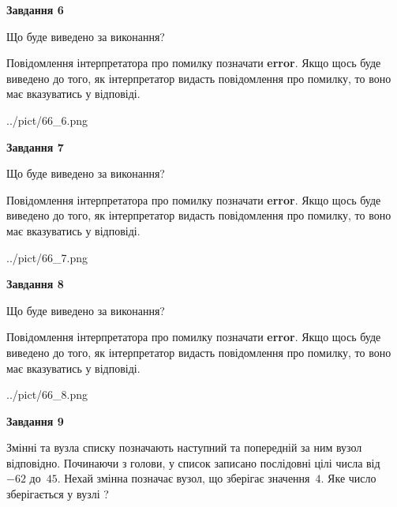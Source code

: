 \documentclass[12pt, ukrainian]{article}
\begin{document}
{\begin {large}
{\begin {center}\textbf{Завдання 6}\end {center}}\par
Що буде виведено за виконання?

Повідомлення інтерпретатора про помилку позначати \textbf{error}.
Якщо щось буде виведено до того, як інтерпретатор видасть повідомлення про помилку, 
то воно має вказуватись у відповіді. \par


\begin{center}
	{../pict/66_6.png}
\end{center}
\newpage

{\begin {center}\textbf{Завдання 7}\end {center}}\par
Що буде виведено за виконання?

Повідомлення інтерпретатора про помилку позначати \textbf{error}.
Якщо щось буде виведено до того, як інтерпретатор видасть повідомлення про помилку, 
то воно має вказуватись у відповіді. \par


\begin{center}
	{../pict/66_7.png}
\end{center}
\newpage

{\begin {center}\textbf{Завдання 8}\end {center}}\par
Що буде виведено за виконання?

Повідомлення інтерпретатора про помилку позначати \textbf{error}.
Якщо щось буде виведено до того, як інтерпретатор видасть повідомлення про помилку, 
то воно має вказуватись у відповіді. \par


\begin{center}
	{../pict/66_8.png}
\end{center}
\newpage

{\begin {center}\textbf{Завдання 9}\end {center}}\par
Змінні  та  вузла списку позначають наступний та попередній за ним вузол відповідно. Починаючи з голови, у список записано послідовні цілі числа від~$-62$ до~$45$. Нехай змінна  позначає вузол, що зберігає значення~$4$.
Яке число зберігається у вузлі  ?\par
\newpage


\end{large}}
\end{document}
